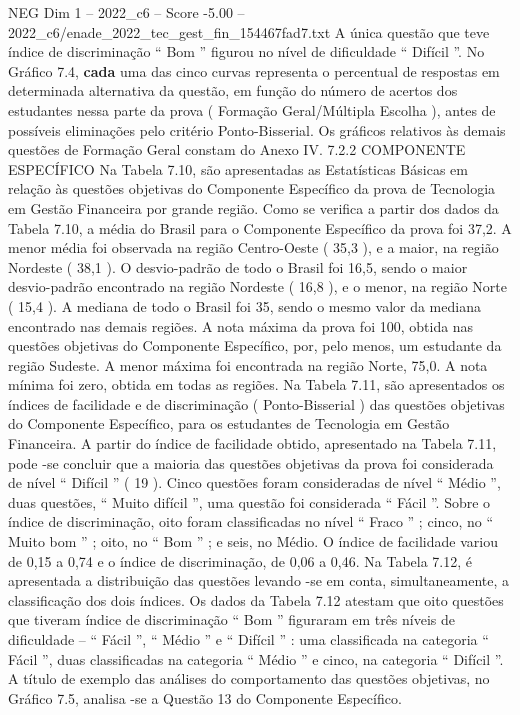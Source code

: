 \begin{textsample}{NEG Dim 1 – 2022\_c6 – Score -5.00 – 2022\_c6/enade\_2022\_tec\_gest\_fin\_154467fad7.txt}
A única questão que teve índice de discriminação “ Bom ” figurou no nível de dificuldade “ Difícil ”.
No Gráfico 7.4, \textbf{cada} uma das cinco curvas representa o percentual de respostas em determinada alternativa da questão, em função do número de acertos dos estudantes nessa parte da prova ( Formação Geral/Múltipla Escolha ), antes de possíveis eliminações pelo critério Ponto-Bisserial.
Os gráficos relativos às demais questões de Formação Geral constam do Anexo IV. 7.2.2 COMPONENTE ESPECÍFICO Na Tabela 7.10, são apresentadas as Estatísticas Básicas em relação às questões objetivas do Componente Específico da prova de Tecnologia em Gestão Financeira por grande região.
Como se verifica a partir dos dados da Tabela 7.10, a média do Brasil para o Componente Específico da prova foi 37,2.
A menor média foi observada na região Centro-Oeste ( 35,3 ), e a maior, na região Nordeste ( 38,1 ).
O desvio-padrão de todo o Brasil foi 16,5, sendo o maior desvio-padrão encontrado na região Nordeste ( 16,8 ), e o menor, na região Norte ( 15,4 ).
A mediana de todo o Brasil foi 35, sendo o mesmo valor da mediana encontrado nas demais regiões.
A nota máxima da prova foi 100, obtida nas questões objetivas do Componente Específico, por, pelo menos, um estudante da região Sudeste.
A menor máxima foi encontrada na região Norte, 75,0.
A nota mínima foi zero, obtida em todas as regiões.
Na Tabela 7.11, são apresentados os índices de facilidade e de discriminação ( Ponto-Bisserial ) das questões objetivas do Componente Específico, para os estudantes de Tecnologia em Gestão Financeira.
A partir do índice de facilidade obtido, apresentado na Tabela 7.11, pode -se concluir que a maioria das questões objetivas da prova foi considerada de nível “ Difícil ” ( 19 ).
Cinco questões foram consideradas de nível “ Médio ”, duas questões, “ Muito difícil ”, uma questão foi considerada “ Fácil ”.
Sobre o índice de discriminação, oito foram classificadas no nível “ Fraco ” ; cinco, no “ Muito bom ” ; oito, no “ Bom ” ; e seis, no Médio.
O índice de facilidade variou de 0,15 a 0,74 e o índice de discriminação, de 0,06 a 0,46.
Na Tabela 7.12, é apresentada a distribuição das questões levando -se em conta, simultaneamente, a classificação dos dois índices.
Os dados da Tabela 7.12 atestam que oito questões que tiveram índice de discriminação “ Bom ” figuraram em três níveis de dificuldade – “ Fácil ”, “ Médio ” e “ Difícil ” : uma classificada na categoria “ Fácil ”, duas classificadas na categoria “ Médio ” e cinco, na categoria “ Difícil ”.
A título de exemplo das análises do comportamento das questões objetivas, no Gráfico 7.5, analisa -se a Questão 13 do Componente Específico.

\end{textsample}
